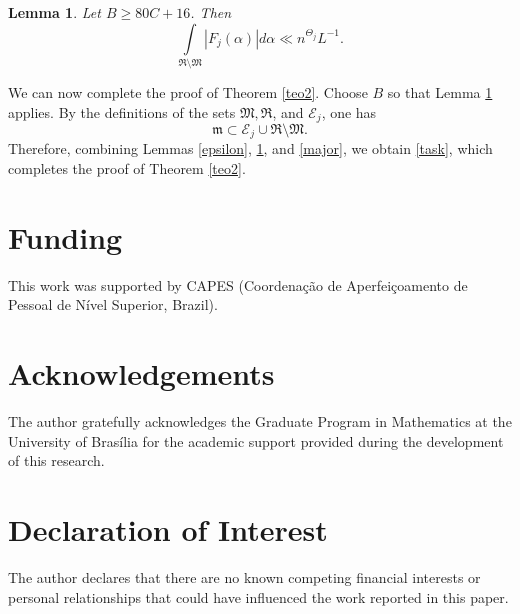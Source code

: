 \documentclass{article}
\theoremstyle{plain}
\newtheorem{lemma}[theorem]{Lemma}
\begin{document}
\begin{lemma}\label{ult}
    Let $B\geq 80C + 16$. Then 
    $$\int \limits_{\mathfrak{R}\setminus \mathfrak{M}} |F_j(\alpha)|d\alpha \ll  n^{\Theta_j}L^{-1}.$$
\end{lemma}

We can now complete the proof of Theorem \ref{teo2}. Choose $B$ so that Lemma \ref{ult} applies. By the definitions of the sets $\mathfrak{M}, \mathfrak{R}$, and $\mathcal{E}_j$, one has 
$$\mathfrak{m}\subset \mathcal{E}_j \cup \mathfrak{R}\setminus \mathfrak{M}.$$
Therefore, combining Lemmas \ref{epsilon}, \ref{ult}, and \ref{major}, we obtain \eqref{task}, which completes the proof of Theorem \ref{teo2}.

\section*{Funding}

This work was supported by CAPES (Coordenação de Aperfeiçoamento de Pessoal de Nível Superior, Brazil).

\section*{Acknowledgements}

The author gratefully acknowledges the Graduate Program in Mathematics at the University of Brasília for the academic support provided during the development of this research. 

\section*{Declaration of Interest}

The author declares that there are no known competing financial interests or personal relationships that could have influenced the work reported in this paper.





\end{document}
